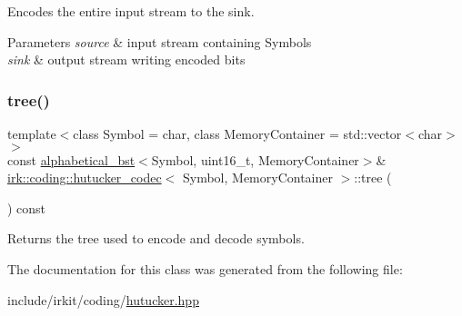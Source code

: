 Encodes the entire input stream to the sink. 


\begin{DoxyParams}{Parameters}
{\em source} & input stream containing {\ttfamily Symbol}s \\
\hline
{\em sink} & output stream writing encoded bits \\
\hline
\end{DoxyParams}
\mbox{\label{classirk_1_1coding_1_1hutucker__codec_a71cf06393d088f76531fe713e06baa1a}} 
\subsubsection{\texorpdfstring{tree()}{tree()}}
{\footnotesize\ttfamily template$<$class Symbol  = char, class Memory\+Container  = std\+::vector$<$char$>$$>$ \\
const \mbox{\hyperlink{classirk_1_1alphabetical__bst}{alphabetical\+\_\+bst}}$<$Symbol, uint16\+\_\+t, Memory\+Container$>$\& \mbox{\hyperlink{classirk_1_1coding_1_1hutucker__codec}{irk\+::coding\+::hutucker\+\_\+codec}}$<$ Symbol, Memory\+Container $>$\+::tree (\begin{DoxyParamCaption}{ }\end{DoxyParamCaption}) const\hspace{0.3cm}{\ttfamily [inline]}}



Returns the tree used to encode and decode symbols. 



The documentation for this class was generated from the following file\+:\begin{DoxyCompactItemize}
\item 
include/irkit/coding/\mbox{\hyperlink{hutucker_8hpp}{hutucker.\+hpp}}\end{DoxyCompactItemize}
